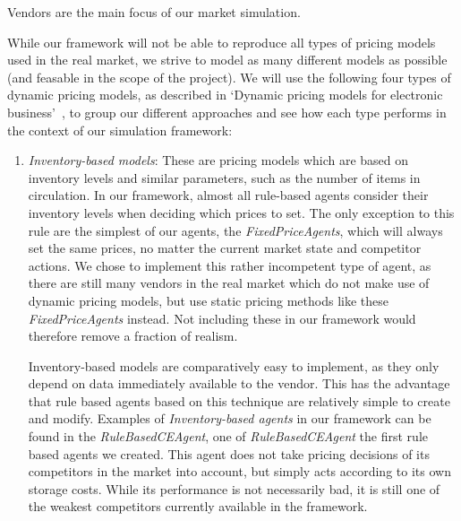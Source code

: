 Vendors are the main focus of our market simulation.

While our framework will not be able to reproduce all types of pricing models used in the real market, we strive to model as many different models as possible (and feasable in the scope of the project). We will use the following four types of dynamic pricing models, as described in `Dynamic pricing models for electronic business'~\cite{dynamicPricingModels}, to group our different approaches and see how each type performs in the context of our simulation framework:

\begin{enumerate}
	\item \emph{Inventory-based models}: These are pricing models which are based on inventory levels and similar parameters, such as the number of items in circulation. In our framework, almost all rule-based agents consider their inventory levels when deciding which prices to set. The only exception to this rule are the simplest of our agents, the \emph{FixedPriceAgents}, which will always set the same prices, no matter the current market state and competitor actions. We chose to implement this rather incompetent type of agent, as there are still many vendors in the real market which do not make use of dynamic pricing models, but use static pricing methods like these \emph{FixedPriceAgents} instead. Not including these in our framework would therefore remove a fraction of realism.

	      Inventory-based models are comparatively easy to implement, as they only depend on data immediately available to the vendor. This has the advantage that rule based agents based on this technique are relatively simple to create and modify. Examples of \emph{Inventory-based agents} in our framework can be found in the \emph{RuleBasedCEAgent}, one of \emph{RuleBasedCEAgent} the first rule based agents we created. This agent does not take pricing decisions of its competitors in the market into account, but simply acts according to its own storage costs. While its performance is not necessarily bad, it is still one of the weakest competitors currently available in the framework. 


\end{enumerate}
